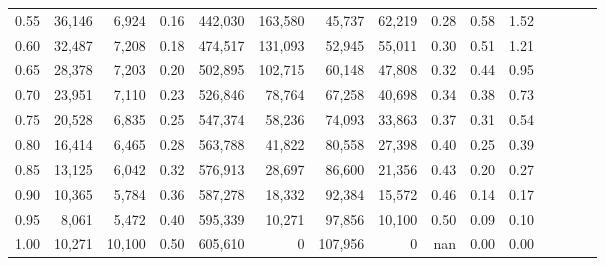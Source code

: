\begin{tabular}{rrrcrrrrrrrrrrr}
0.55 &  36,146 &   6,924 &                                       0.16 &  442,030 &  163,580 &   45,737 &   62,219 &  0.28 &  0.58 &                         1.52 \\
0.60 &  32,487 &   7,208 &                                       0.18 &  474,517 &  131,093 &   52,945 &   55,011 &  0.30 &  0.51 &                         1.21 \\
0.65 &  28,378 &   7,203 &                                       0.20 &  502,895 &  102,715 &   60,148 &   47,808 &  0.32 &  0.44 &                         0.95 \\
0.70 &  23,951 &   7,110 &                                       0.23 &  526,846 &   78,764 &   67,258 &   40,698 &  0.34 &  0.38 &                         0.73 \\
0.75 &  20,528 &   6,835 &                                       0.25 &  547,374 &   58,236 &   74,093 &   33,863 &  0.37 &  0.31 &                         0.54 \\
0.80 &  16,414 &   6,465 &                                       0.28 &  563,788 &   41,822 &   80,558 &   27,398 &  0.40 &  0.25 &                         0.39 \\
0.85 &  13,125 &   6,042 &                                       0.32 &  576,913 &   28,697 &   86,600 &   21,356 &  0.43 &  0.20 &                         0.27 \\
0.90 &  10,365 &   5,784 &                                       0.36 &  587,278 &   18,332 &   92,384 &   15,572 &  0.46 &  0.14 &                         0.17 \\
0.95 &   8,061 &   5,472 &                                       0.40 &  595,339 &   10,271 &   97,856 &   10,100 &  0.50 &  0.09 &                         0.10 \\
1.00 &  10,271 &  10,100 &                                       0.50 &  605,610 &        0 &  107,956 &        0 &   nan &  0.00 &                         0.00 \\
\bottomrule
\end{tabular}

